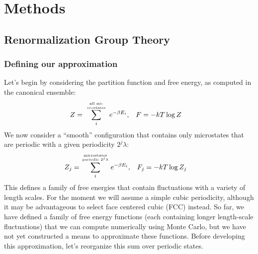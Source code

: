 \documentclass[letterpaper,twocolumn,amsmath,amssymb,pre,aps,10pt]{revtex4-1}
\begin{document}
\section{Methods}

\subsection{Renormalization Group Theory}

\subsubsection{Defining our approximation}
Let's begin by considering the partition function and free energy, as
computed in the canonical ensemble:
\begin{align}
  Z &= \sum_i^{\text{\tiny\begin{minipage}{5em}
      \begin{center}
        \tiny all microstates\end{center}\end{minipage}}}
       e^{-\beta E_i}, & F &= -kT\log Z
\end{align}
We now consider a ``smooth'' configuration that contains only
microstates that are periodic with a given periodicity $2^j\lambda$:
\newcommand\sumstatesperiodic[1]{\sum_i^{\text{\tiny\begin{minipage}{6em}
      \begin{center}
        \tiny microstates periodic $#1$\end{center}\end{minipage}}}}
\begin{align}
  Z_j &= \sumstatesperiodic{2^j\lambda}
       e^{-\beta E_i}, & F_j &= -kT\log Z_j
       \label{eq:Zn}
\end{align}
This defines a family of free energies that contain fluctuations with
a variety of length scales.  For the moment we will assume a simple
cubic periodicity, although it may be advantageous to select face
centered cubic (FCC) instead.  So far, we have defined a family of
free energy functions (each containing longer length-scale
fluctuations) that we can compute numerically using Monte Carlo, but
we have not yet constructed a means to approximate these functions.
Before developing this approximation, let's reorganize this sum over
periodic states.
\end{document}
